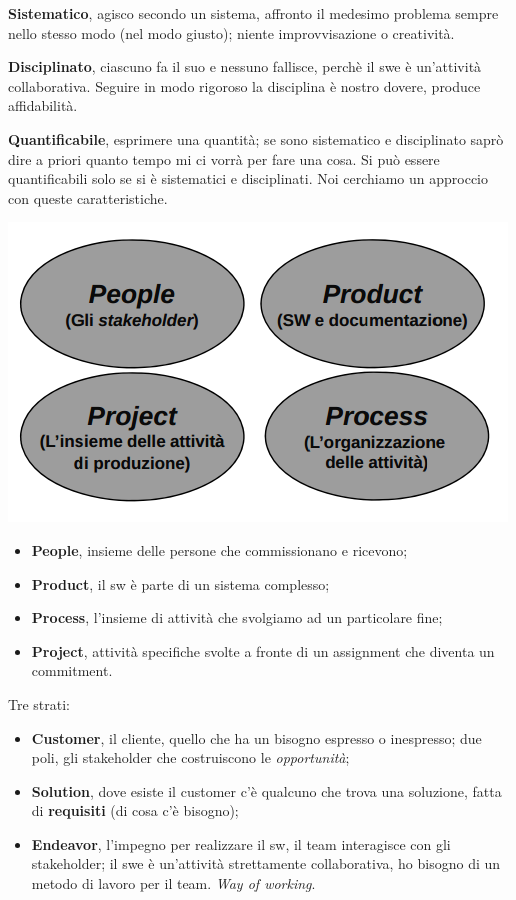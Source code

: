\textbf{Sistematico}, agisco secondo un sistema, affronto il medesimo problema sempre nello stesso modo (nel modo giusto); niente improvvisazione o creatività.

\textbf{Disciplinato}, ciascuno fa il suo e nessuno fallisce, perchè il swe è un'attività collaborativa. Seguire in modo rigoroso la disciplina è nostro dovere, produce affidabilità.

\textbf{Quantificabile}, esprimere una quantità; se sono sistematico e disciplinato saprò dire a priori quanto tempo mi ci vorrà per fare una cosa. Si può essere quantificabili solo se si è sistematici e disciplinati. Noi cerchiamo un approccio con queste caratteristiche.

\begin{center}

\includegraphics[width=0.75\columnwidth]{img1} %

\end{center}

\begin{itemize}

	\item \textbf{People}, insieme delle persone che commissionano e ricevono;

	\item \textbf{Product}, il sw è parte di un sistema complesso;

	\item \textbf{Process}, l'insieme di attività che svolgiamo ad un particolare fine;

	\item \textbf{Project}, attività specifiche svolte a fronte di un assignment che diventa un commitment.

\end{itemize}

Tre strati:

\begin{itemize}

	\item \textbf{Customer}, il cliente, quello che ha un bisogno espresso o inespresso; due poli, gli stakeholder che costruiscono le \textit{opportunità};
	\item \textbf{Solution}, dove esiste il customer c'è qualcuno che trova una soluzione, fatta di \textbf{requisiti} (di cosa c'è bisogno);
	\item \textbf{Endeavor}, l'impegno per realizzare il sw, il team interagisce con gli stakeholder; il swe è un'attività strettamente collaborativa, ho bisogno di un metodo di lavoro per il team. \textit{Way of working}.

\end{itemize}

